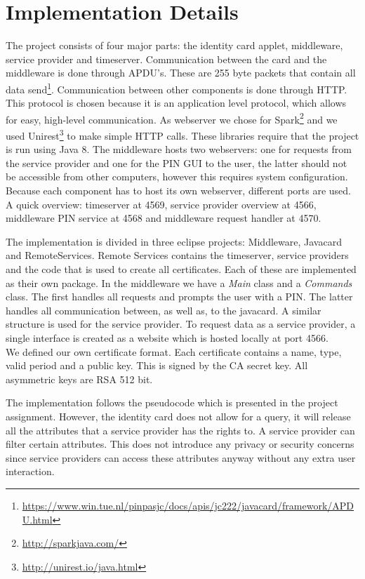 \documentclass[12pt]{report}
\begin{document}
\section{Implementation Details}
The project consists of four major parts: the identity card applet, middleware, service provider and timeserver. Communication between the card and the middleware is done through APDU's. These are 255 byte packets that contain all data send\footnote{\url{https://www.win.tue.nl/pinpasjc/docs/apis/jc222/javacard/framework/APDU.html}}. Communication between other components is done through HTTP. This protocol is chosen because it is an application level protocol, which allows for easy, high-level communication. As webserver we chose for Spark\footnote{\url{http://sparkjava.com/}} and we used Unirest\footnote{\url{http://unirest.io/java.html}} to make simple HTTP calls. These libraries require that the project is run using Java 8. The middleware hosts two webservers: one for requests from the service provider and one for the PIN GUI to the user, the latter should not be accessible from other computers, however this requires system configuration. Because each component has to host its own webserver, different ports are used. A quick overview: timeserver at 4569, service provider overview at 4566, middleware PIN service at 4568 and middleware request handler at 4570.

The implementation is divided in three eclipse projects: Middleware, Javacard and RemoteServices. Remote Services contains the timeserver, service providers and the code that is used to create all certificates. Each of these are implemented as their own package. In the middleware we have a \emph{Main} class and a \emph{Commands} class. The first handles all requests and prompts the user with a PIN. The latter handles all communication between, as well as, to the javacard. A similar structure is used for the service provider. To request data as a service provider, a single interface is created as a website which is hosted locally at port 4566.\\
We defined our own certificate format. Each certificate contains a name, type, valid period and a public key. This is signed by the CA secret key. All asymmetric keys are RSA 512 bit.

The implementation follows the pseudocode which is presented in the project assignment. However, the identity card does not allow for a query, it will release all the attributes that a service provider has the rights to. A service provider can filter certain attributes. This does not introduce any privacy or security concerns since service providers can access these attributes anyway without any extra user interaction.
\end{document}
